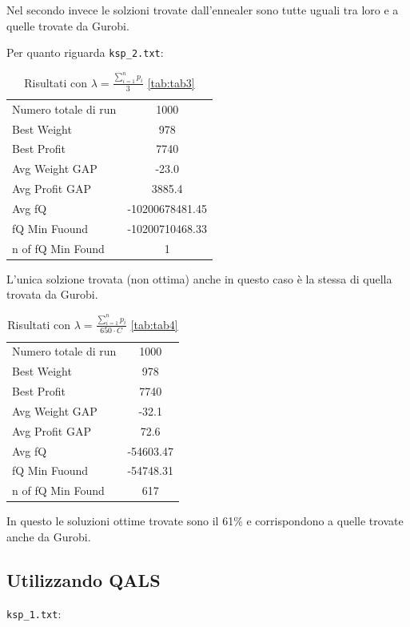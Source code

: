 \documentclass[a4paper,12pt]{article}
\begin{document}
Nel secondo invece le solzioni trovate dall'ennealer sono tutte uguali tra loro e a quelle trovate 
da Gurobi.

Per quanto riguarda \texttt{ksp\_2.txt}:

\begin{table}[H]
\centering
\begin{tabular}{lc}
\toprule
Numero totale di run & 1000 \\
Best Weight & 978 \\
Best Profit & 7740 \\
Avg Weight GAP & -23.0 \\
Avg Profit GAP & 3885.4 \\
Avg fQ & -10200678481.45 \\
fQ Min Fuound & -10200710468.33 \\
n of fQ Min Found & 1 \\
\bottomrule
\end{tabular}
\caption{Risultati con $\lambda = \displaystyle \frac{\sum_{i=1}^{n} p_i}{3}$ \ref{tab:tab3}}
\end{table}

L'unica solzione trovata (non ottima) anche in questo caso è la stessa di quella trovata da
Gurobi.

\begin{table}[H]
\centering
\begin{tabular}{lc}
\toprule
Numero totale di run & 1000 \\
Best Weight & 978 \\
Best Profit & 7740 \\
Avg Weight GAP & -32.1 \\
Avg Profit GAP & 72.6 \\
Avg fQ & -54603.47 \\
fQ Min Fuound & -54748.31 \\
n of fQ Min Found & 617 \\
\bottomrule
\end{tabular}
\caption{Risultati con $\lambda = \displaystyle \frac{\sum_{i=1}^{n} p_i}{650 \cdot C}$ \ref{tab:tab4}}
\end{table}

In questo le soluzioni ottime trovate sono il 61\% e corrispondono a quelle trovate anche da Gurobi.

\subsection{Utilizzando QALS}

\texttt{ksp\_1.txt}:
\end{document}
